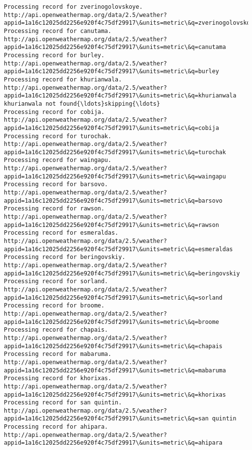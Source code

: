 \documentclass[11pt]{article}
\begin{document}
\begin{Verbatim}[commandchars=\\\{\}]
Processing record for zverinogolovskoye.
http://api.openweathermap.org/data/2.5/weather?appid=1a16c12025dd2256e920f4c75df29917\&units=metric\&q=zverinogolovskoye
Processing record for canutama.
http://api.openweathermap.org/data/2.5/weather?appid=1a16c12025dd2256e920f4c75df29917\&units=metric\&q=canutama
Processing record for burley.
http://api.openweathermap.org/data/2.5/weather?appid=1a16c12025dd2256e920f4c75df29917\&units=metric\&q=burley
Processing record for khurianwala.
http://api.openweathermap.org/data/2.5/weather?appid=1a16c12025dd2256e920f4c75df29917\&units=metric\&q=khurianwala
khurianwala not found{\ldots}skipping{\ldots}
Processing record for cobija.
http://api.openweathermap.org/data/2.5/weather?appid=1a16c12025dd2256e920f4c75df29917\&units=metric\&q=cobija
Processing record for turochak.
http://api.openweathermap.org/data/2.5/weather?appid=1a16c12025dd2256e920f4c75df29917\&units=metric\&q=turochak
Processing record for waingapu.
http://api.openweathermap.org/data/2.5/weather?appid=1a16c12025dd2256e920f4c75df29917\&units=metric\&q=waingapu
Processing record for barsovo.
http://api.openweathermap.org/data/2.5/weather?appid=1a16c12025dd2256e920f4c75df29917\&units=metric\&q=barsovo
Processing record for rawson.
http://api.openweathermap.org/data/2.5/weather?appid=1a16c12025dd2256e920f4c75df29917\&units=metric\&q=rawson
Processing record for esmeraldas.
http://api.openweathermap.org/data/2.5/weather?appid=1a16c12025dd2256e920f4c75df29917\&units=metric\&q=esmeraldas
Processing record for beringovskiy.
http://api.openweathermap.org/data/2.5/weather?appid=1a16c12025dd2256e920f4c75df29917\&units=metric\&q=beringovskiy
Processing record for sorland.
http://api.openweathermap.org/data/2.5/weather?appid=1a16c12025dd2256e920f4c75df29917\&units=metric\&q=sorland
Processing record for broome.
http://api.openweathermap.org/data/2.5/weather?appid=1a16c12025dd2256e920f4c75df29917\&units=metric\&q=broome
Processing record for chapais.
http://api.openweathermap.org/data/2.5/weather?appid=1a16c12025dd2256e920f4c75df29917\&units=metric\&q=chapais
Processing record for mabaruma.
http://api.openweathermap.org/data/2.5/weather?appid=1a16c12025dd2256e920f4c75df29917\&units=metric\&q=mabaruma
Processing record for khorixas.
http://api.openweathermap.org/data/2.5/weather?appid=1a16c12025dd2256e920f4c75df29917\&units=metric\&q=khorixas
Processing record for san quintin.
http://api.openweathermap.org/data/2.5/weather?appid=1a16c12025dd2256e920f4c75df29917\&units=metric\&q=san quintin
Processing record for ahipara.
http://api.openweathermap.org/data/2.5/weather?appid=1a16c12025dd2256e920f4c75df29917\&units=metric\&q=ahipara

\end{Verbatim}
\end{document}

